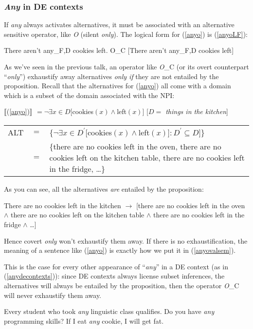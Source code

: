 \documentclass[a4paper,11pt]{article}
\newcommand{\reff}[1]{(\ref{#1})}
\newcommand{\eval}[2][]{$\llbracket$#2$\rrbracket_{#1}$}
\newcommand{\exs}[2][]{\begin{exe}\ex #1 \begin{xlist}#2\end{xlist}\end{exe}}
\begin{document}
\subsubsection{\emph{Any} in DE contexts}
If \emph{any} always activates alternatives, it must be associated with an alternative sensitive operator, like \emph{O} (silent \emph{only}). The logical form for \reff{anyo} is \reff{anyoLF}:

\exs{
	\ex\label{anyo} There aren't any_{F,D} cookies left.
	\ex\label{anyoLF} O_C [There aren't any_{F,D} cookies left]
}
%
As we've seen in the previous talk, an operator like \emph{O}_C (or its overt counterpart \enquote{\emph{only}}) exhaustify away alternatives \emph{only if} they are not entailed by the proposition. Recall that the alternatives for \reff{anyo} all come with a domain which is a subset of the domain associated with the NPI:

\exs[]{
  \ex\label{anyovalsem} \eval{\reff{anyo}} $= \neg\exists{x \in D}[$cookies$(x) \wedge $left$(x)]$ \hfill [\emph{$D =$ things in the kitchen}]
  \ex \begin{tabular}[t]{llp{12cm}}\toprule[-12.5pt]
  		ALT & $=$ & $\{\neg\exists{x \in D^\prime}[$cookies$(x) \wedge $left$(x)]: D^\prime \subseteq D]$\}\\
  		    & $=$ & \{there are no cookies left in the oven, there are no cookies left on the kitchen table, there are no cookies left in the fridge, \ldots{}\}
  \end{tabular}  
}
%
As you can see, all the alternatives \emph{are} entailed by the proposition:

\begin{exe}
\ex There are no cookies left in the kitchen $\rightarrow$ [there are no cookies left in the oven $\wedge$ there are no cookies left on the kitchen table $\wedge$ there are no cookies left in the fridge $\wedge$ \ldots{}]
\end{exe}
%
Hence covert \emph{only} won't exhaustify them away. If there is no exhaustification, the meaning of a sentence like \reff{anyo} is exactly how we put it in \reff{anyovalsem}.

This is the case for every other appearance of \enquote{\emph{any}} in a DE context (as in \reff{anydecontexts}): since DE contexts always license subset inferences, the alternatives will always be entailed by the proposition, then the operator \emph{O}_C will never exhaustify them away.

\exs[\label{anydecontexts}]{
  \ex Every student who took \emph{any} linguistic class qualifies.
  \ex Do you have \emph{any} programming skills?
  \ex If I eat \emph{any} cookie, I will get fat.
}
\end{document}
